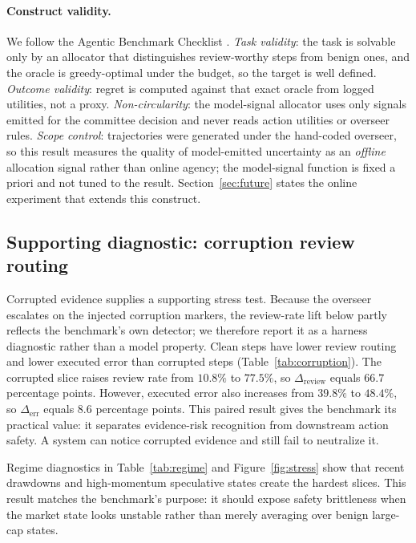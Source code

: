 \documentclass[10pt,twocolumn]{article}
\begin{document}
\paragraph{Construct validity.}
We follow the Agentic Benchmark Checklist \citep{zhu2025agenticchecklist}. \emph{Task validity}: the task is solvable only by an allocator that distinguishes review-worthy steps from benign ones, and the oracle is greedy-optimal under the budget, so the target is well defined. \emph{Outcome validity}: regret is computed against that exact oracle from logged utilities, not a proxy. \emph{Non-circularity}: the model-signal allocator uses only signals emitted for the committee decision and never reads action utilities or overseer rules. \emph{Scope control}: trajectories were generated under the hand-coded overseer, so this result measures the quality of model-emitted uncertainty as an \emph{offline} allocation signal rather than online agency; the model-signal function is fixed a priori and not tuned to the result. Section~\ref{sec:future} states the online experiment that extends this construct.

\subsection{Supporting diagnostic: corruption review routing}




Corrupted evidence supplies a supporting stress test. Because the overseer escalates on the injected corruption markers, the review-rate lift below partly reflects the benchmark's own detector; we therefore report it as a harness diagnostic rather than a model property. Clean steps have lower review routing and lower executed error than corrupted steps (Table~\ref{tab:corruption}). The corrupted slice raises review rate from \(10.8\%\) to \(77.5\%\), so \(\Delta_{\mathrm{review}}\) equals \(66.7\) percentage points. However, executed error also increases from \(39.8\%\) to \(48.4\%\), so \(\Delta_{\mathrm{err}}\) equals \(8.6\) percentage points. This paired result gives the benchmark its practical value: it separates evidence-risk recognition from downstream action safety. A system can notice corrupted evidence and still fail to neutralize it.

Regime diagnostics in Table~\ref{tab:regime} and Figure~\ref{fig:stress} show that recent drawdowns and high-momentum speculative states create the hardest slices. This result matches the benchmark's purpose: it should expose safety brittleness when the market state looks unstable rather than merely averaging over benign large-cap states.
\end{document}
